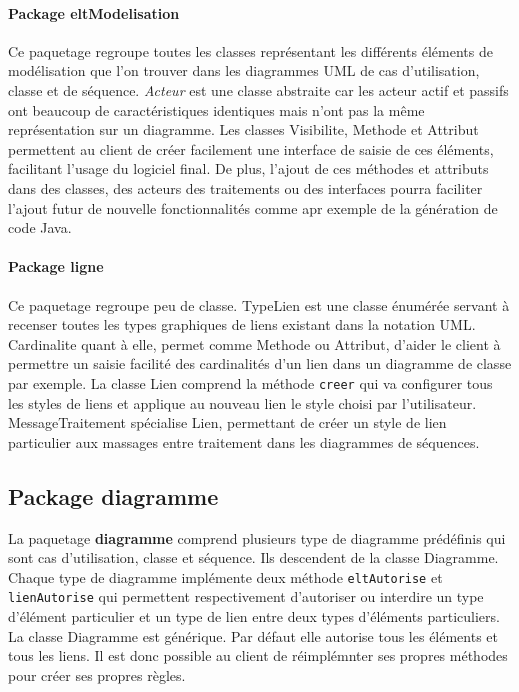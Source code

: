 \documentclass[12pt,a4paper,openany]{report}
\begin{document}
	\paragraph{Package eltModelisation} Ce paquetage regroupe toutes les classes représentant les différents éléments de 
	modélisation que l'on trouver dans les diagrammes UML de cas d'utilisation, classe et de séquence. \textit{Acteur} 
	est une classe abstraite car les acteur actif et passifs ont beaucoup de caractéristiques identiques mais n'ont pas 
	la même représentation sur un diagramme. Les classes Visibilite, Methode et Attribut permettent au client de créer 
	facilement une interface de saisie de ces éléments, facilitant l'usage du logiciel final. De plus, l'ajout de ces 
	méthodes et attributs dans des classes, des acteurs des traitements ou des interfaces pourra faciliter l'ajout futur 
	de nouvelle fonctionnalités comme apr exemple de la génération de code Java.
	\paragraph{Package ligne} Ce paquetage regroupe peu de classe. TypeLien est une classe énumérée servant à recenser
	toutes les types graphiques de liens existant dans la notation UML. Cardinalite quant à elle, permet comme Methode 
	ou Attribut, d'aider le client à permettre un saisie facilité des cardinalités d'un lien dans un diagramme de classe par exemple.
	La classe Lien comprend la méthode \texttt{creer} qui va configurer tous les styles de liens et applique au nouveau lien
	le style choisi par l'utilisateur. MessageTraitement spécialise Lien, permettant de créer un style de lien particulier
	aux massages entre traitement dans les diagrammes de séquences.
	\subsection{Package diagramme}
	La paquetage \textbf{diagramme} comprend plusieurs type de diagramme prédéfinis qui sont cas d'utilisation, classe et séquence.
	Ils descendent de la classe Diagramme. Chaque type de diagramme implémente deux méthode \texttt{eltAutorise} et \texttt{lienAutorise}
	qui permettent respectivement d'autoriser ou interdire un type d'élément particulier et un type de lien entre deux types d'éléments
	particuliers. La classe Diagramme est générique. Par défaut elle autorise tous les éléments et tous les liens. Il est donc possible
	au client de réimplémnter ses propres méthodes pour créer ses propres règles.
	
\end{document}
